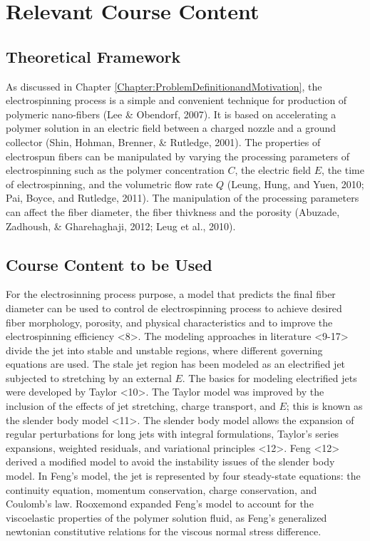 \chapter{Relevant Course Content} %

\label{Chapter:RelevantCourseContent}

\section{Theoretical Framework}
As discussed in Chapter \ref{Chapter:ProblemDefinitionandMotivation}, the electrospinning process is a simple and convenient technique for production of polymeric nano-fibers (Lee \& Obendorf, 2007). It is based on accelerating a polymer solution in an electric field between a charged nozzle and a ground collector (Shin, Hohman, Brenner, \& Rutledge, 2001). The properties of electrospun fibers can be manipulated by varying the processing parameters of electrospinning such as the polymer concentration $C$, the electric field $E$, the time of electrospinning, and the volumetric flow rate $Q$ (Leung, Hung, and Yuen, 2010; Pai, Boyce, and Rutledge, 2011). The manipulation of the processing parameters can affect the fiber diameter, the fiber thivkness and the porosity (Abuzade, Zadhoush, \& Gharehaghaji, 2012; Leug et al., 2010).

\section{Course Content to be Used}
For the electrosinning process purpose, a model that predicts the final fiber diameter can be used to control de electrospinning process to achieve desired fiber morphology, porosity, and physical characteristics and to improve the electrospinning efficiency <8>. The modeling approaches in literature <9-17> divide the jet into stable and unstable regions, where different governing equations are used. The stale jet region has been modeled as an electrified jet subjected to stretching by an external $E$. The basics for modeling electrified jets were developed by Taylor <10>. The Taylor model was improved by the inclusion of the effects of jet stretching, charge transport, and $E$; this is known as the slender body model <11>. The slender body model allows the expansion of regular perturbations for long jets with integral formulations, Taylor's series expansions, weighted residuals, and variational principles <12>. Feng <12> derived a modified model to avoid the instability issues of the slender body model. In Feng's model, the jet is represented by four steady-state equations: the continuity equation, momentum conservation, charge conservation, and Coulomb's law. Rooxemond expanded Feng's model to account for the viscoelastic properties of the polymer solution fluid, as Feng's generalized newtonian constitutive relations for the viscous normal stress difference.


